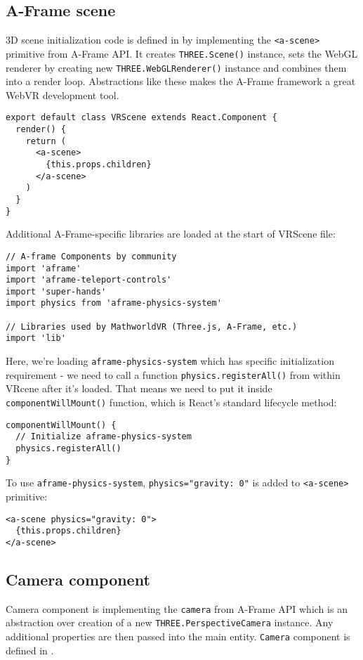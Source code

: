 \subsection{A-Frame scene}
3D scene initialization code is defined in  by implementing the \texttt{<a-scene>} primitive from A-Frame API. It creates \texttt{THREE.Scene()} instance, sets the WebGL renderer by creating new \texttt{THREE.WebGLRenderer()} instance and combines them into a render loop. Abstractions like these makes the A-Frame framework a great WebVR development tool.

\begin{lstlisting}[caption={\textsl{VRScene} component.},captionpos=b]
export default class VRScene extends React.Component {
  render() {
    return (
      <a-scene>
        {this.props.children}
      </a-scene>
    )
  }
}
\end{lstlisting}

Additional A-Frame-specific libraries are loaded at the start of VRScene file:

\begin{lstlisting}
// A-frame Components by community
import 'aframe'
import 'aframe-teleport-controls'
import 'super-hands'
import physics from 'aframe-physics-system'

// Libraries used by MathworldVR (Three.js, A-Frame, etc.)
import 'lib'
\end{lstlisting}

Here, we're loading \texttt{aframe-physics-system} which has specific initialization requirement - we need to call a function \texttt{physics.registerAll()} from within VRcene after it's loaded. That means we need to put it inside \texttt{componentWillMount()} function, which is React's standard lifecycle method:

\begin{lstlisting}
componentWillMount() {
  // Initialize aframe-physics-system
  physics.registerAll()
}
\end{lstlisting}

To use \texttt{aframe-physics-system}, \texttt{physics="gravity: 0"} is added to \texttt{<a-scene>} primitive:

\begin{lstlisting}
<a-scene physics="gravity: 0">
  {this.props.children}
</a-scene>
\end{lstlisting}

\subsection{Camera component}
Camera component is implementing the \texttt{camera} from A-Frame API which is an abstraction over creation of a new \texttt{THREE.PerspectiveCamera} instance. Any additional properties are then passed into the main entity. \texttt{Camera} component is defined in .

